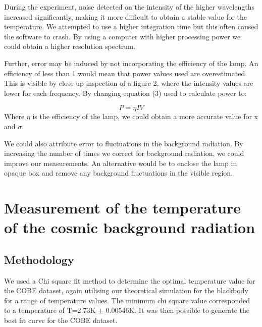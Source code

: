 \documentclass{article}%
\begin{document}
During the experiment, noise detected on the intensity of the higher wavelengths increased significantly, making it more diificult
to obtain a stable value for the temperature. We attempted to use a higher integration time but this often caused the software to crash.
By using a computer with higher processing power we could obtain a higher resolution spectrum. \par

Further, error may be induced by not incorporating the efficiency of the lamp. An efficiency of less than 1 would mean that power values used
are overestimated. This is visible by close up inspection of a figure 2, where the intensity values are lower for each frequency. By changing equation (3) used to calculate power to:

\begin{equation}
  P = \eta I V
\end{equation}
Where $\eta$ is the efficiency of the lamp, we could obtain a more accurate value for x and $\sigma$. \par

We could also attribute error to fluctuations in the background radiation. By increasing the number of times we correct for background radiation, we could improve our measurements. 
An alternative would be to enclose the lamp in opaque box and remove any background fluctuations in the visible region. \par
%

%
\section{Measurement of the temperature of the cosmic background radiation}%
\label{sec:Measurementofthetemperatureofthecosmicbackgroundradiation}%
%
\subsection{Methodology}%
\label{subsec:Methodology}%
We used a Chi square fit method to determine the optimal temperature value for the COBE dataset,
again utilising our theoretical simulation for the blackbody for a range of temperature values.
The minimum chi square value corresponded to a temperature of T=2.73K $\pm$ 0.00546K. It was then possible to generate the best fit curve for the COBE dataset. \cite{github}
%
\end{document}
